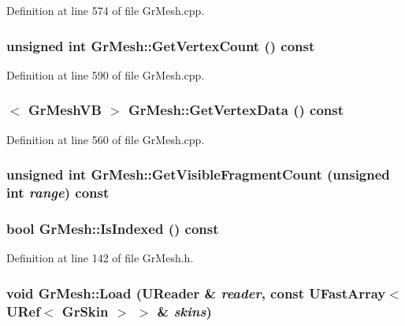 Definition at line 574 of file GrMesh.cpp.\hypertarget{class_gr_mesh_3b42e0893f6ac4d502122860069a88b8}{
\subsubsection[{GetVertexCount}]{\setlength{\rightskip}{0pt plus 5cm}unsigned int GrMesh::GetVertexCount () const}}
\label{class_gr_mesh_3b42e0893f6ac4d502122860069a88b8}




Definition at line 590 of file GrMesh.cpp.\hypertarget{class_gr_mesh_590cc2567fbac6ca8f5516319c911e04}{
\subsubsection[{GetVertexData}]{$<$ {\bf GrMeshVB} $>$ GrMesh::GetVertexData () const}}
\label{class_gr_mesh_590cc2567fbac6ca8f5516319c911e04}




Definition at line 560 of file GrMesh.cpp.\hypertarget{class_gr_mesh_7a74c51e8e35a304afd20334129e1815}{
\subsubsection[{GetVisibleFragmentCount}]{\setlength{\rightskip}{0pt plus 5cm}unsigned int GrMesh::GetVisibleFragmentCount (unsigned int {\em range}) const}}
\label{class_gr_mesh_7a74c51e8e35a304afd20334129e1815}


\hypertarget{class_gr_mesh_884ad3e5c22eb0cd45bf633cdae8ac08}{
\subsubsection[{IsIndexed}]{\setlength{\rightskip}{0pt plus 5cm}bool GrMesh::IsIndexed () const}}
\label{class_gr_mesh_884ad3e5c22eb0cd45bf633cdae8ac08}




Definition at line 142 of file GrMesh.h.\hypertarget{class_gr_mesh_4ade8286c992e61e1029bab4e75a4eb9}{
\subsubsection[{Load}]{\setlength{\rightskip}{0pt plus 5cm}void GrMesh::Load ({\bf UReader} \& {\em reader}, \/  const {\bf UFastArray}$<$ {\bf URef}$<$ {\bf GrSkin} $>$ $>$ \& {\em skins})}}
\label{class_gr_mesh_4ade8286c992e61e1029bab4e75a4eb9}





